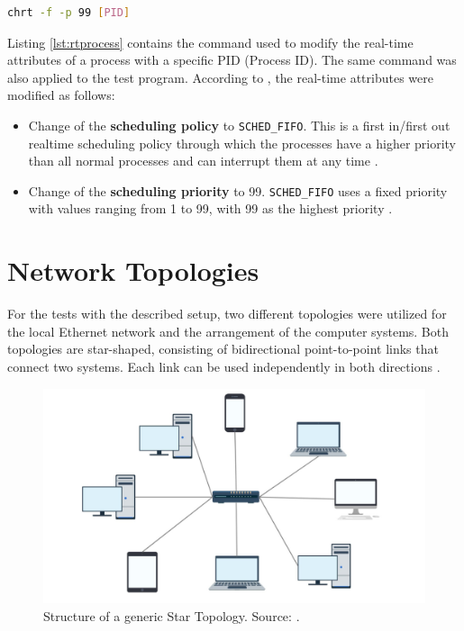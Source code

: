 \begin{lstlisting}[language=Bash, caption=Modification of the real-time Attributes of a Process., label=lst:rtprocess]
chrt -f -p 99 [PID]
\end{lstlisting}

Listing \ref{lst:rtprocess} contains the command used to modify the real-time attributes of a process with a specific PID (Process ID). The same command was also applied to the test program. According to \cite{swsetup05}, the real-time attributes were modified as follows:

\begin{itemize}
\item Change of the \textbf{scheduling policy} to \texttt{SCHED\_FIFO}. This is a first in/first out realtime scheduling policy through which the processes have a higher priority than all normal processes and can interrupt them at any time \cite{swsetup06}.
\item Change of the \textbf{scheduling priority} to 99. \texttt{SCHED\_FIFO} uses a fixed priority with values ranging from 1 to 99, with 99 as the highest priority \cite{swsetup06}.
\end{itemize}



\section{Network Topologies} \label{chap:Architectures}
For the tests with the described setup, two different topologies were utilized for the local Ethernet network and the arrangement of the computer systems. Both topologies are star-shaped, consisting of bidirectional point-to-point links that connect two systems. Each link can be used independently in both directions \cite{Tanenbaum2010}.


\begin{figure}[h]
    \centering
    \includegraphics[width=0.6\linewidth]{figures/method/topo1.png}
    \caption[Structure of a generic Star Topology]{Structure of a generic Star Topology. Source: \cite{topo01}.}
    \label{fig:startopoGeneral}
\end{figure}

